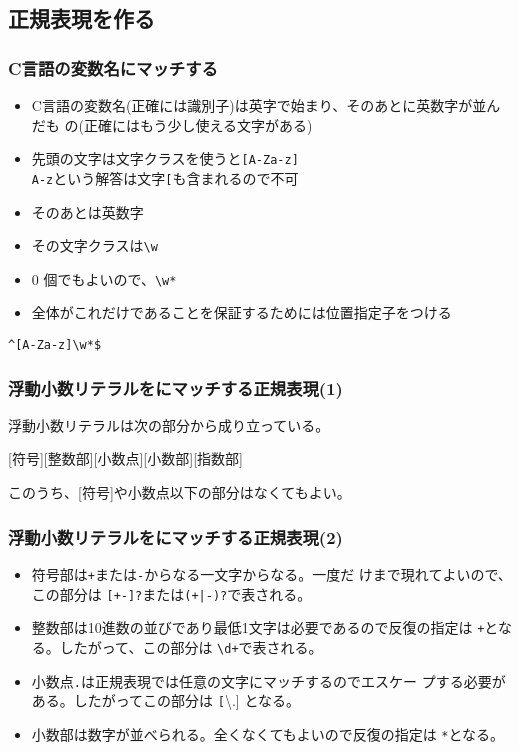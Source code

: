 \subsection{正規表現を作る}
\begin{frame}[containsverbatim]
 \frametitle{C言語の変数名にマッチする}
\begin{itemize}
 \item C言語の変数名(正確には識別子)は英字で始まり、そのあとに英数字が並んだも
の(正確にはもう少し使える文字がある)
 \item 先頭の文字は文字クラスを使うと\texttt{[A-Za-z]}\\
			 \texttt{A-z}という解答は文字\texttt{[}も含まれるので不可
 \item そのあとは英数字
 \item その文字クラスは\texttt{\textbackslash w}
 \item $0$ 個でもよいので、\texttt{\textbackslash w*}
 \item 全体がこれだけであることを保証するためには位置指定子をつける
\end{itemize}
{\LARGE
\Verb+^[A-Za-z]\w*$+}
\end{frame}
\begin{frame}[containsverbatim]
 \frametitle{浮動小数リテラルをにマッチする正規表現(1)}
浮動小数リテラルは次の部分から成り立っている。

[符号][整数部][小数点][小数部][指数部]

このうち、[符号]や小数点以下の部分はなくてもよい。

\end{frame}
\begin{frame}[containsverbatim]
 \frametitle{浮動小数リテラルをにマッチする正規表現(2)}
\begin{itemize}
 \item 符号部は\texttt{+}または\texttt{-}からなる一文字からなる。一度だ
       けまで現れてよいので、この部分は \texttt{[+-]?}または\texttt{(+|-)?}で表される。
 \item 整数部は10進数の並びであり最低1文字は必要であるので反復の指定は
       \texttt{+}となる。したがって、この部分は \texttt{\textbackslash d+}で表される。
 \item 小数点\texttt{.}は正規表現では任意の文字にマッチするのでエスケー
       プする必要がある。したがってこの部分は \texttt[\textbackslash .]
       となる。
 \item 小数部は数字が並べられる。全くなくてもよいので反復の指定は
       \texttt{*}となる。
\end{itemize}
\end{frame}
